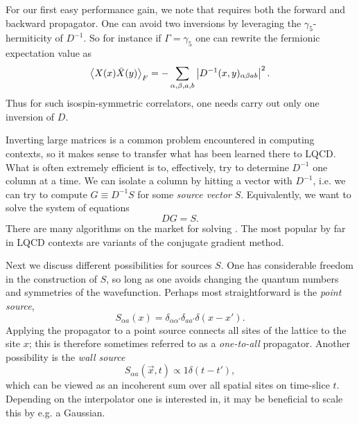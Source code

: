For our first easy performance gain, we note that 
requires both the forward and backward propagator. One can avoid two inversions by 
leveraging the $\gamma_5$-hermiticity of $D^{-1}$. So for instance if
$\Gamma=\gamma_5$ one can rewrite 
the fermionic expectation value as
\begin{equation}
\ev{X(x)\bar{X}(y)}_F=-\sum_{\alpha,\beta,a,b}\left|D^{-1}(x,y)_{\alpha\beta
ab}\right|^2.
\end{equation}
Thus for such isospin-symmetric correlators, one needs carry out only one
inversion of $D$.

Inverting large matrices is a common problem encountered in computing contexts,
so it makes sense to transfer what has been learned there to LQCD. What is often
extremely efficient is to, effectively, try to determine $D^{-1}$ one column at
a time. We can isolate a column by hitting a vector with $D^{-1}$, i.e. we can
try to compute $G\equiv D^{-1}S$ for some {\it source vector} $S$.
Equivalently, we want to solve the system of equations
\begin{equation}\label{eq:invertSchematic}
DG=S.
\end{equation}
There are many algorithms on the market for solving
. The most popular by far in LQCD contexts are
variants of the conjugate gradient method.

Next we discuss different possibilities for sources $S$. One has considerable
freedom in the construction of $S$, so long as one avoids changing the quantum
numbers and symmetries of the wavefunction. Perhaps most
straightforward is the {\it point source},
\begin{equation}\label{eq:pointSource}
S_{\alpha a}(x)=\delta_{\alpha \alpha'}\delta_{a a'}\delta(x-x').
\end{equation}
Applying the propagator to a point source connects all sites of the lattice to
the site $x$; this is therefore sometimes referred to as a {\it one-to-all}
propagator. Another possibility is the {\it wall
source}
\begin{equation}\label{eq:wallSource}
S_{\alpha a}(\vec{x},t)\propto 1\delta(t-t'),
\end{equation}
which can be viewed as an incoherent sum over all spatial sites on time-slice
$t$. Depending on the interpolator one is interested in, it may be beneficial to
scale this by e.g. a Gaussian. 

